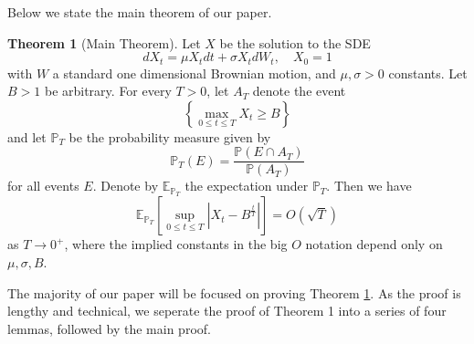 \documentclass{article}
\theoremstyle{definition}
\newtheorem{theorem}{Theorem}
\theoremstyle{definition}
\begin{document}
Below we state the main theorem of our paper.
\begin{theorem}[Main Theorem]\label{maintheorem} Let $X$ be the solution to the SDE
$$
d X_{t}=\mu X_{t} d t+\sigma X_{t} d W_{t}, \quad X_{0}=1
$$
with $W$ a standard one dimensional Brownian motion, and $\mu, \sigma>0$ constants. Let $B>1$ be arbitrary. For every $T>0$, let $A_{T}$ denote the event
$$
\left\{\max _{0 \leq t \leq T} X_{t} \geq B\right\}
$$
and let $\mathbb{P}_{T}$ be the probability measure given by
$$
\mathbb{P}_{T}(E)=\frac{\mathbb{P}\left(E \cap A_{T}\right)}{\mathbb{P}\left(A_{T}\right)}
$$
for all events $E$. Denote by $\mathbb{E}_{\mathbb{P}_{T}}$ the expectation under $\mathbb{P}_{T}$. Then we have
$$
\mathbb{E}_{\mathbb{P}_{T}}\left[\sup _{0 \leq t \leq T}\left|X_{t}-B^{\frac{t}{T}}\right|\right]=O(\sqrt{T})
$$
as $T \rightarrow 0^{+}$, where the implied constants in the big $O$ notation depend only on $\mu, \sigma, B$.
\end{theorem}
The majority of our paper will be focused on proving Theorem \ref{maintheorem}. As the proof is lengthy and technical, we seperate the proof of Theorem 1 into a series of four lemmas, followed by the main proof.
\end{document}
